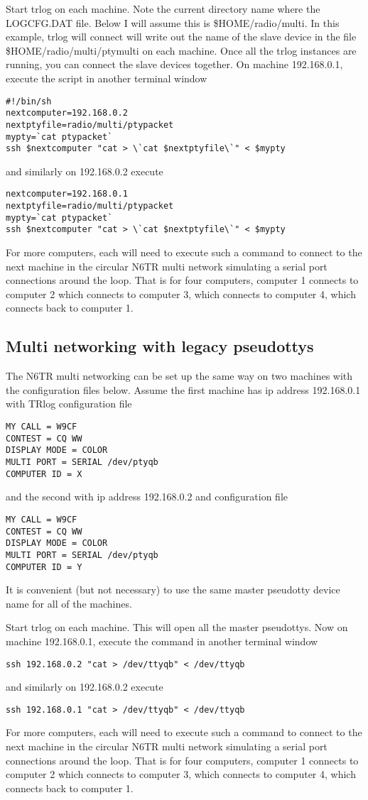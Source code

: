 \documentclass[12pt]{article}
\begin{document}
Start trlog on each machine. Note the current
directory name where the LOGCFG.DAT
file. Below I will assume this is \$HOME/radio/multi.
In this example,
trlog will connect will write out the name of the slave device
in the file \$HOME/radio/multi/ptymulti on each machine.
Once all the trlog instances are running, you can connect the
slave devices together.
On machine 192.168.0.1, execute the script in another terminal window
\begin{verbatim}
#!/bin/sh
nextcomputer=192.168.0.2
nextptyfile=radio/multi/ptypacket
mypty=`cat ptypacket`
ssh $nextcomputer "cat > \`cat $nextptyfile\`" < $mypty
\end{verbatim}
and similarly on 192.168.0.2 execute
\begin{verbatim}
nextcomputer=192.168.0.1
nextptyfile=radio/multi/ptypacket
mypty=`cat ptypacket`
ssh $nextcomputer "cat > \`cat $nextptyfile\`" < $mypty
\end{verbatim}
For more computers,
each will need to execute such a command to connect to the
next machine in the circular N6TR multi network simulating a serial
port connections around the loop. That is for four computers,
computer 1 connects to computer 2
which connects to computer 3, which connects to computer 4, which connects
back to computer 1.

\subsection{Multi networking with legacy pseudottys}
The N6TR multi networking can be set up the same way on two machines
with the configuration files below. Assume the first machine has ip
address 192.168.0.1 with TRlog configuration file
\begin{verbatim}
MY CALL = W9CF
CONTEST = CQ WW
DISPLAY MODE = COLOR
MULTI PORT = SERIAL /dev/ptyqb
COMPUTER ID = X
\end{verbatim}
and the second with ip address 192.168.0.2 and configuration file
\begin{verbatim}
MY CALL = W9CF
CONTEST = CQ WW
DISPLAY MODE = COLOR
MULTI PORT = SERIAL /dev/ptyqb
COMPUTER ID = Y
\end{verbatim}
It is convenient (but not necessary)
to use the same master pseudotty device name for all
of the machines.

Start trlog on each machine. This will open all the master pseudottys.
Now on machine 192.168.0.1, execute the command in another terminal window
\begin{verbatim}
ssh 192.168.0.2 "cat > /dev/ttyqb" < /dev/ttyqb
\end{verbatim}
and similarly on 192.168.0.2 execute
\begin{verbatim}
ssh 192.168.0.1 "cat > /dev/ttyqb" < /dev/ttyqb
\end{verbatim}
For more computers,
each will need to execute such a command to connect to the
next machine in the circular N6TR multi network simulating a serial
port connections around the loop. That is for four computers,
computer 1 connects to computer 2
which connects to computer 3, which connects to computer 4, which connects
back to computer 1.
\end{document}
